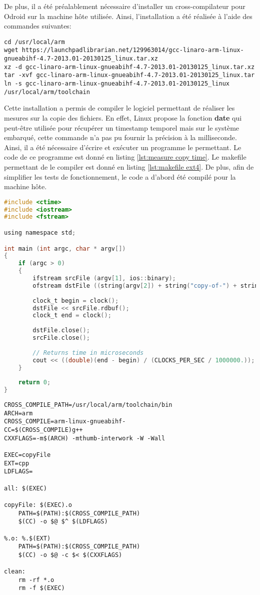 De plus, il a été préalablement nécessaire d'installer un cross-compilateur pour Odroid sur la machine hôte utilisée. Ainsi, l'installation a été réalisée à l'aide des commandes suivantes:
\begin{lstlisting}[style=Bash]
cd /usr/local/arm
wget https://launchpadlibrarian.net/129963014/gcc-linaro-arm-linux-gnueabihf-4.7-2013.01-20130125_linux.tar.xz
xz -d gcc-linaro-arm-linux-gnueabihf-4.7-2013.01-20130125_linux.tar.xz 
tar -xvf gcc-linaro-arm-linux-gnueabihf-4.7-2013.01-20130125_linux.tar
ln -s gcc-linaro-arm-linux-gnueabihf-4.7-2013.01-20130125_linux /usr/local/arm/toolchain
\end{lstlisting}
Cette installation a permis de compiler le logiciel permettant de réaliser les mesures sur la copie des fichiers. En effet, Linux propose la fonction \textbf{date} qui peut-être utilisée pour récupérer un timestamp temporel mais sur le système embarqué, cette commande n'a pas pu fournir la précision à la milliseconde. Ainsi, il a été nécessaire d'écrire et exécuter un programme le permettant. Le code de ce programme est donné en listing \ref{lst:measure copy time}. Le makefile permettant de le compiler est donné en listing \ref{lst:makefile ext4}. De plus, afin de simplifier les tests de fonctionnement, le code a d'abord été compilé pour la machine hôte.
\begin{lstlisting}[language=C,caption=Mesure du temps de copie,label=lst:measure copy time]
#include <ctime>
#include <iostream>
#include <fstream>

using namespace std;

int main (int argc, char * argv[])
{
	if (argc > 0)
	{
		ifstream srcFile (argv[1], ios::binary);
		ofstream dstFile ((string(argv[2]) + string("copy-of-") + string(argv[1])).c_str(), ios::binary);
		
		clock_t	begin = clock();
		dstFile << srcFile.rdbuf();
		clock_t	end = clock();
		
		dstFile.close();
		srcFile.close();
		
		// Returns time in microseconds
		cout << ((double)(end - begin) / (CLOCKS_PER_SEC / 1000000.));
	}
	
	return 0;
}
\end{lstlisting}
\begin{lstlisting}[label=lst:makefile ext4,caption=makefile permettant la compilation pour la cible]
CROSS_COMPILE_PATH=/usr/local/arm/toolchain/bin
ARCH=arm
CROSS_COMPILE=arm-linux-gnueabihf-
CC=$(CROSS_COMPILE)g++
CXXFLAGS=-m$(ARCH) -mthumb-interwork -W -Wall

EXEC=copyFile
EXT=cpp
LDFLAGS=

all: $(EXEC)

copyFile: $(EXEC).o 
	PATH=$(PATH):$(CROSS_COMPILE_PATH)
	$(CC) -o $@ $^ $(LDFLAGS)

%.o: %.$(EXT)
	PATH=$(PATH):$(CROSS_COMPILE_PATH)
	$(CC) -o $@ -c $< $(CXXFLAGS)

clean:
	rm -rf *.o
	rm -f $(EXEC)
\end{lstlisting}

